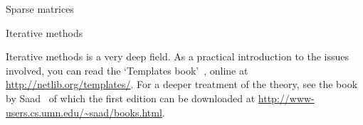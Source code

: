  {Sparse matrices}
\label{sec:sparse}


 {Iterative methods}
\label{sec:iterative}



\furtherreading

Iterative methods is a very deep field. As a practical introduction to
the issues involved, you can read the `Templates
book'~\cite{Ba:templates}, online at
\url{http://netlib.org/templates/}. For a deeper treatment of the
theory, see the book by Saad~\cite{saad96} of which the first edition
can be downloaded at
\url{http://www-users.cs.umn.edu/~saad/books.html}.
